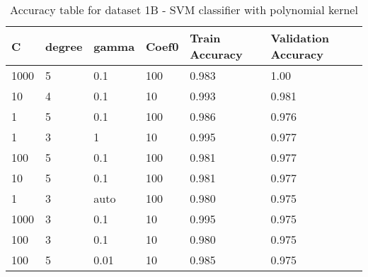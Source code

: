 \def\arraystretch{1.25}
\begin{table}[H]
\centering
\begin{tabular}{l l l l l l}
\hline
\hline
\textbf{C} & \textbf{degree} & \textbf{gamma} & \textbf{Coef0} & \textbf{Train Accuracy} & \textbf{Validation Accuracy}\\
\hline
\hline
1000 & 5 & 0.1 & 100 & 0.983 & 1.00 \\
10 & 4 & 0.1 & 10 & 0.993 & 0.981 \\
1 & 5 & 0.1 & 100 & 0.986 & 0.976  \\
1 & 3 & 1 & 10 & 0.995 & 0.977 \\
100 & 5 & 0.1 & 100 & 0.981 & 0.977 \\
10 & 5 & 0.1 & 100 & 0.981 & 0.977 \\
1 & 3 & auto & 100 & 0.980 & 0.975 \\
1000 & 3 & 0.1 & 10 & 0.995 & 0.975 \\
100 & 3 & 0.1 & 10 & 0.980 & 0.975 \\
100 & 5 & 0.01 & 10 & 0.985 & 0.975 \\

\hline
\end{tabular}
\caption{Accuracy table for dataset 1B - SVM classifier with polynomial kernel}
\end{table}